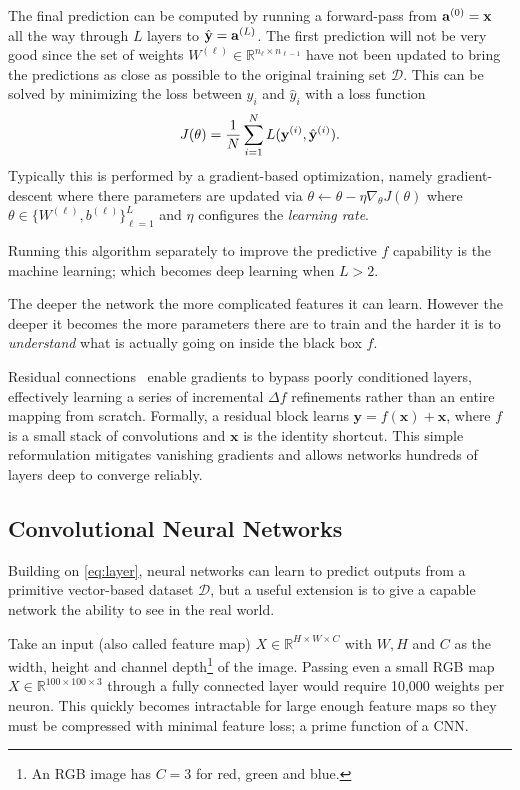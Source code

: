 The final prediction can be computed by running a forward-pass from $\bold a^{(0)} = \bold x$ all the way through $L$ layers to $\hat{\bold y} = \bold a^{(L)}$. The first prediction will not be very good since the set of weights $W^{(\ell)} \in \mathbb R^{n_{\ell}\times n_{\ell - 1}}$ have not been updated to bring the predictions as close as possible to the original training set $\mathcal D$. This can be solved by minimizing the loss between $y_i$ and $\hat{y}_i$ with a loss function 
\begin{equation*}
    J(\theta) = \dfrac{1}{N} \sum_{i = 1}^{N} L(\bold{y}^{(i)},  \hat{\bold{y}}^{(i)}).
\end{equation*}
Typically this is performed by a gradient-based optimization, namely gradient-descent where there parameters are updated via $\theta \leftarrow \theta -\eta \nabla_{\theta}J(\theta)$ where $\theta \in \{W^{(\ell)}, b^{(\ell)}\}^L_{\ell=1}$ and $\eta$ configures the \textit{learning rate}.

Running this algorithm separately to improve the predictive $f$ capability is the machine learning; which becomes deep learning when $L > 2$.

The deeper the network the more complicated features it can learn. However the deeper it becomes the more parameters there are to train and the harder it is to \textit{understand} what is actually going on inside the black box $f$. 

Residual connections~\cite{RESNET2016} enable gradients to bypass
poorly conditioned layers, effectively learning a series of
incremental $\Delta f$ refinements rather than an entire mapping from
scratch.  Formally, a residual block learns
$\mathbf{y} = f(\mathbf{x}) + \mathbf{x}$, where
$f$ is a small stack of convolutions and
$\mathbf{x}$ is the identity shortcut.  This simple reformulation
mitigates vanishing gradients and allows networks hundreds of layers
deep to converge reliably.

\subsection{Convolutional Neural Networks} 

Building on \cref{eq:layer}, neural networks can learn to predict outputs from a primitive vector-based dataset $\mathcal D$, but a useful extension is to give a capable network the ability to see in the real world. 

Take an input (also called feature map) $X \in \mathbb R^{H\times W \times C}$ with $W, H$ and $C$ as the width, height and channel depth\footnote{An \ac{RGB} image has $C = 3$ for red, green and blue.} of the image. Passing even a small \ac{RGB} map $X\in \mathbb R^{100\times 100\times 3}$ through a fully connected layer would require 10,000 weights per neuron. This quickly becomes intractable for large enough feature maps so they must be compressed with minimal feature loss; a prime function of a \ac{CNN}.

